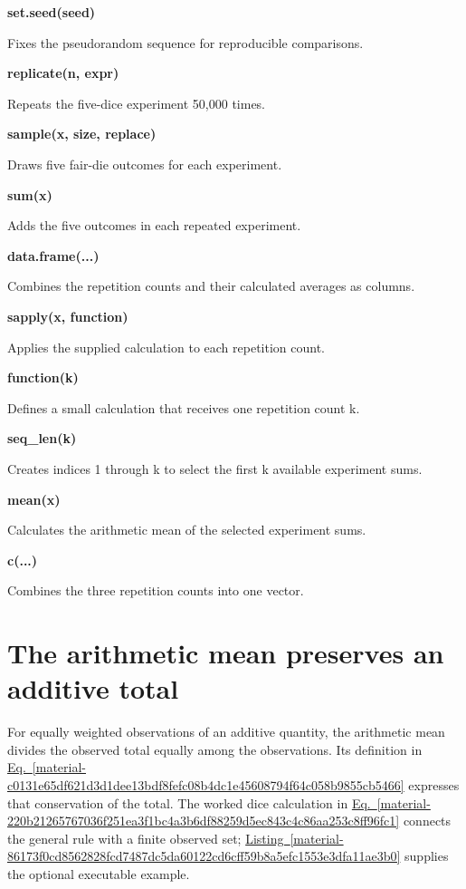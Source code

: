 \documentclass[11pt,a4paper]{article}
\begin{document}
\par\noindent\textbf{set.seed(seed)}

Fixes the pseudorandom sequence for reproducible comparisons.

\par\noindent\textbf{replicate(n, expr)}

Repeats the five-dice experiment 50,000 times.

\par\noindent\textbf{sample(x, size, replace)}

Draws five fair-die outcomes for each experiment.

\par\noindent\textbf{sum(x)}

Adds the five outcomes in each repeated experiment.

\par\noindent\textbf{data.frame(...)}

Combines the repetition counts and their calculated averages as columns.

\par\noindent\textbf{sapply(x, function)}

Applies the supplied calculation to each repetition count.

\par\noindent\textbf{function(k)}

Defines a small calculation that receives one repetition count k.

\par\noindent\textbf{seq\_len(k)}

Creates indices 1 through k to select the first k available experiment sums.

\par\noindent\textbf{mean(x)}

Calculates the arithmetic mean of the selected experiment sums.

\par\noindent\textbf{c(...)}

Combines the three repetition counts into one vector.

\medskip

\clearpage
\section{The arithmetic mean preserves an additive total}
For equally weighted observations of an additive quantity, the arithmetic mean divides the observed total equally among the observations. Its definition in \hyperref[material-c0131e65df621d3d1dee13bdf8fefc08b4dc1e45608794f64c058b9855cb5466]{Eq.~\ref*{material-c0131e65df621d3d1dee13bdf8fefc08b4dc1e45608794f64c058b9855cb5466}} expresses that conservation of the total. The worked dice calculation in \hyperref[material-220b21265767036f251ea3f1bc4a3b6df88259d5ec843c4c86aa253c8ff96fc1]{Eq.~\ref*{material-220b21265767036f251ea3f1bc4a3b6df88259d5ec843c4c86aa253c8ff96fc1}} connects the general rule with a finite observed set; \hyperref[material-86173f0cd8562828fcd7487dc5da60122cd6cff59b8a5efc1553e3dfa11ae3b0]{Listing~\ref*{material-86173f0cd8562828fcd7487dc5da60122cd6cff59b8a5efc1553e3dfa11ae3b0}} supplies the optional executable example.
\end{document}
